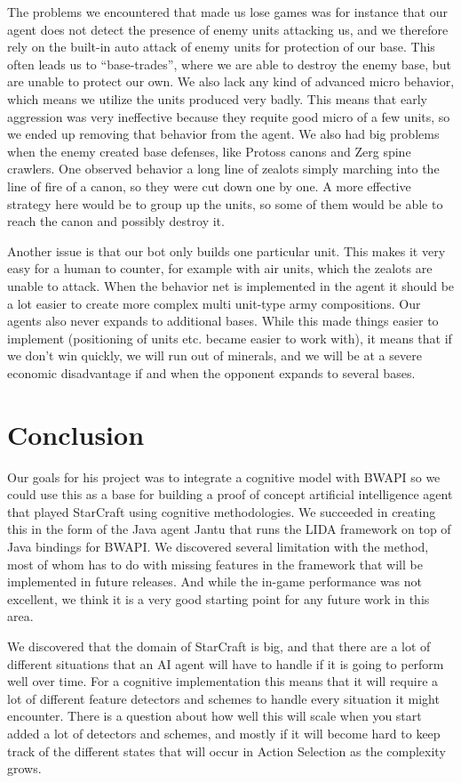 The problems we encountered that made us lose games was for instance that our agent does not detect the presence of enemy units attacking us, and we therefore rely on the built-in auto attack of enemy units for protection of our base. This often leads us to ``base-trades'', where we are able to destroy the enemy base, but are unable to protect our own.
We also lack any kind of advanced micro behavior, which means we utilize the units produced very badly. This means that early aggression was very ineffective because they requite good micro of a few units, so we ended up removing that behavior from the agent. We also had big problems when the enemy created base defenses, like Protoss canons and Zerg spine crawlers. One observed behavior a long line of zealots simply marching into the line of fire of a canon, so they were cut down one by one. A more effective strategy here would be to group up the units, so some of them would be able to reach the canon and possibly destroy it.

Another issue is that our bot only builds one particular unit. This makes it very easy for a human to counter, for example with air units, which the zealots are unable to attack. When the behavior net is implemented in the agent it should be a lot easier to create more complex multi unit-type army compositions.
Our agents also never expands to additional bases. While this made things easier to implement (positioning of units etc. became easier to work with), it means that if we don't win quickly, we will run out of minerals, and we will be at a severe economic disadvantage if and when the opponent expands to several bases.

\section{Conclusion}
\label{sec:conclusion}
Our goals for his project was to integrate a cognitive model with BWAPI so we could use this as a base for building a proof of concept artificial intelligence agent that played StarCraft using cognitive methodologies. 
We succeeded in creating this in the form of the Java agent Jantu that runs the LIDA framework on top of Java bindings for BWAPI. We discovered several limitation with the method, most of whom has to do with missing features in the framework that will be implemented in future releases. And while the in-game performance was not excellent, we think it is a very good starting point for any future work in this area.

We discovered that the domain of StarCraft is big, and that there are a lot of different situations that an AI agent will have to handle if it is going to perform well over time. For a cognitive implementation this means that it will require a lot of different feature detectors and schemes to handle every situation it might encounter. There is a question about how well this will scale when you start added a lot of detectors and schemes, and mostly if it will become hard to keep track of the different states that will occur in Action Selection as the complexity grows.

